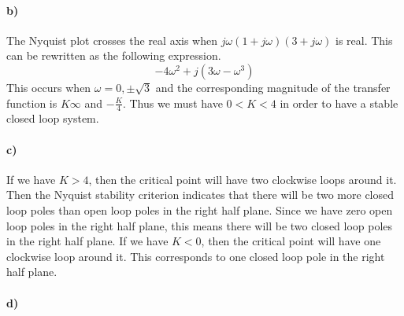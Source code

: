 \documentclass[12pt]{article}
\begin{document}
\paragraph{b)}

The Nyquist plot crosses the real axis when \(j\omega(1+j\omega)(3+j\omega)\) is real. This can be rewritten
as the following expression.
\[-4\omega^2+j(3\omega-\omega^3)\]
This occurs when \(\omega=0,\pm \sqrt{3}\) and the corresponding magnitude of the transfer function is
\(K\infty\) and \(-\frac{K}{4}\). Thus we must have \(0<K<4\) in order to have a stable closed loop system.

\paragraph{c)}

If we have \(K>4\), then the critical point will have two clockwise loops around it. Then the Nyquist stability
criterion indicates that there will be two more closed loop poles than open loop poles in the right half plane.
Since we have zero open loop poles in the right half plane, this means there will be two closed loop poles in
the right half plane. If we have \(K<0\), then the critical point will have one clockwise loop around it. This corresponds
to one closed loop pole in the right half plane.

\paragraph{d)}
\end{document}
